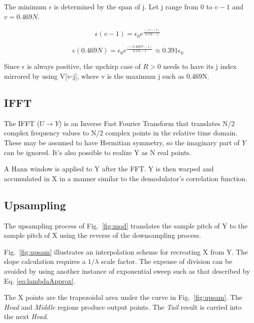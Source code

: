 The minimum $\epsilon$ is determined by the span of j.
Let j range from 0 to $v-1$ and $v = 0.469N$.

\begin{equation}
\epsilon(v-1) = \epsilon_0 e^\frac{-(v-1)}{0.5N - 1}
\end{equation}

\begin{equation}
\epsilon(0.469N) = \epsilon_0 e^\frac{-(0.469N-1)}{0.5N - 1}
\approx 0.391 \epsilon_0
\end{equation}

Since $\epsilon$ is always positive, the upchirp case of $R>0$ needs to have its
j index mirrored by using V[v-j], where v is the maximum j such as 0.469N.

\subsection{IFFT}

The IFFT ($U \rightarrow Y$) is an Inverse Fast Fourier Transform that
translates N/2 complex frequency values to N/2 complex points in the relative
time domain. These may be assumed to have Hermitian symmetry,
so the imaginary part of $Y$ can be ignored.
It's also possible to realize Y as N real points.

A Hann window is applied to Y after the FFT. Y is then warped and accumulated
in X in a manner similar to the demodulator's correlation function.

\subsection{Upsampling}

The upsampling process of Fig.~\ref{fig:mod} translates the sample pitch of
Y to the sample pitch of X using the reverse of the downsampling process.

Fig.~\ref{fig:upsam} illustrates an interpolation scheme for recreating X from Y.
The slope calculation requires a $1/\lambda$ scale factor.
The expense of division can be avoided by using another instance of exponential
sweep such as that described by Eq. \ref{eq:lambdaApprox}.

The X points are the trapezoidal area under the curve in Fig.~\ref{fig:upsam}.
The \textit{Head} and \textit{Middle} regions produce output points.
The \textit{Tail} result is carried into the next \textit{Head}.

